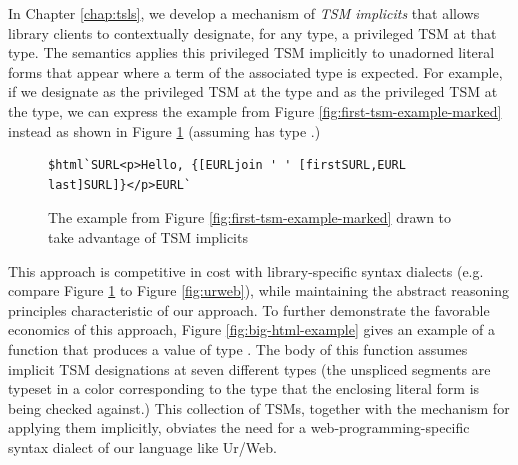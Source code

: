 In Chapter \ref{chap:tsls}, we develop a mechanism of \emph{TSM implicits} that allows library clients to contextually designate, for any type, a privileged TSM at that type. The semantics applies this privileged TSM implicitly to unadorned literal forms that appear where a term of the associated type is expected. For example, if we designate  as the privileged TSM at the  type and  as the privileged TSM at the  type, we can express the example from Figure \ref{fig:first-tsm-example-marked} instead as shown in Figure \ref{fig:first-tsm-example-implicit} (assuming  has type .) 
\begin{figure}[h]
\begin{lstlisting}[numbers=none]
$html`SURL<p>Hello, {[EURLjoin ' ' [firstSURL,EURL last]SURL]}</p>EURL`
\end{lstlisting}
\caption{The example from Figure \ref{fig:first-tsm-example-marked} drawn to take advantage of TSM implicits}
\label{fig:first-tsm-example-implicit}
\end{figure}

\noindent This approach is competitive in cost with library-specific syntax dialects (e.g. compare Figure \ref{fig:first-tsm-example-implicit} to Figure \ref{fig:urweb}), while maintaining the abstract reasoning principles characteristic of our approach. To further demonstrate the favorable economics of this approach, Figure \ref{fig:big-html-example} gives an example of a function that produces a value of type . The body of this function assumes implicit TSM designations at seven different types (the unspliced segments are typeset in a color corresponding to the type that the enclosing literal form is being checked against.) This collection of TSMs, together with the mechanism for applying them implicitly, obviates the need for a web-programming-specific syntax dialect of our language like Ur/Web.

